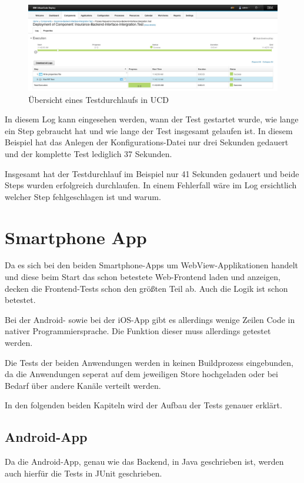 \begin{figure}[h]
  \centering
    \includegraphics[scale=0.3]{images/kapitel_5/ucd_teststage_duration.pdf}
  \caption{Übersicht eines Testdurchlaufs in UCD}
  \label{fig:ucd_teststage_duration}
\end{figure}

In diesem Log kann eingesehen werden, wann der Test gestartet wurde, wie lange ein Step gebraucht hat und wie lange der
Test insgesamt gelaufen ist. In diesem Beispiel hat das Anlegen der Konfigurations-Datei nur drei Sekunden gedauert und
der komplette Test lediglich 37 Sekunden.

Insgesamt hat der Testdurchlauf im Beispiel nur 41 Sekunden gedauert und beide Steps wurden erfolgreich durchlaufen. In
einem Fehlerfall wäre im Log ersichtlich welcher Step fehlgeschlagen ist und warum.

\section{Smartphone App}
Da es sich bei den beiden Smartphone-Apps um WebView-Applikationen handelt und diese beim Start das schon betestete Web-Frontend
laden und anzeigen, decken die Frontend-Tests schon den größten Teil ab. Auch die Logik ist schon betestet.

Bei der Android- sowie bei der iOS-App gibt es allerdings wenige Zeilen Code in nativer Programmiersprache. Die
Funktion dieser muss allerdings getestet werden.

Die Tests der beiden Anwendungen werden in keinen Buildprozess eingebunden, da die Anwendungen seperat auf dem jeweiligen
Store hochgeladen oder bei Bedarf über andere Kanäle verteilt werden.

In den folgenden beiden Kapiteln wird der Aufbau der Tests genauer erklärt.

\subsection{Android-App}
Da die Android-App, genau wie das Backend, in Java geschrieben ist, werden auch hierfür die Tests in JUnit geschrieben.

